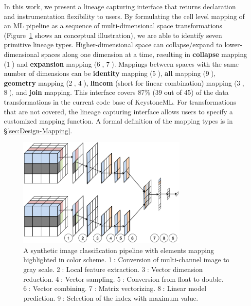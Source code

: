 \documentclass{sig-alternate}
\begin{document}
In this work, we present a lineage capturing interface that returns declaration and instrumentation flexibility to users. 
By formulating the cell level mapping of an ML pipeline as a sequence of multi-dimensional space transformations
(Figure~\ref{fig:conceptual} shows an conceptual illustration), we are able to identify seven primitive lineage types.
Higher-dimensional space can collapse/expand to lower-dimensional spaces along one dimension at a time, 
resulting in {\bf collapse} mapping (\textcircled{1}) and {\bf expansion} mapping (\textcircled{6}, \textcircled{7}). 
Mappings between spaces with the same number of dimensions can be {\bf identity} mapping (\textcircled{5}), {\bf all} mapping (\textcircled{9}), 
{\bf geometry} mapping (\textcircled{2}, \textcircled{4}), {\bf lincom} (short for linear combination) mapping (\textcircled{3}, \textcircled{8}),
and {\bf join} mapping. 
This interface covers 87\% (39 out of 45) of the data transformations in the current code base of KeystoneML. 
For transformations that are not covered, the lineage capturing interface allows users to specify a customized mapping function.
A formal definition of the mapping types is in \S\ref{sec:Design-Mapping}.

\begin{figure}[h]
\begin{center}
    \includegraphics[width=85mm]{pictures/Conceptual}
    \caption {A synthetic image classification pipeline with elements mapping highlighted in color scheme. 
    \textcircled{1}: Conversion of multi-channel image to gray scale.
    \textcircled{2}: Local feature extraction.
    \textcircled{3}: Vector dimension reduction.
    \textcircled{4}: Vector sampling.
    \textcircled{5}: Conversion from float to double.
    \textcircled{6}: Vector combining.
    \textcircled{7}: Matrix vectorizing.
    \textcircled{8}: Linear model prediction.
    \textcircled{9}: Selection of the index with maximum value.
    \label{fig:conceptual}
}
\end{center}
\end{figure}
\end{document}
